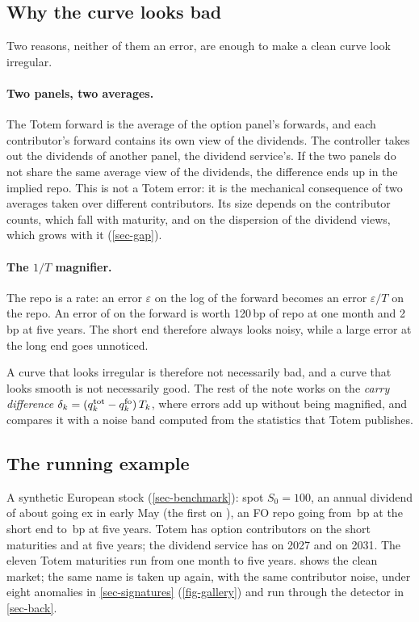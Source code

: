 \subsection{Why the curve looks bad}
Two reasons, neither of them an error, are enough to make a clean curve look irregular.

\paragraph{Two panels, two averages.} The Totem forward is the average of the option panel's forwards, and each
contributor's forward contains its own view of the dividends. The controller takes out the dividends of another panel,
the dividend service's. If the two panels do not share the same average view of the dividends, the difference ends
up in the implied repo. This is not a Totem error: it is the mechanical consequence of two averages taken over
different contributors. Its size depends on the contributor counts, which fall with maturity, and on the dispersion of
the dividend views, which grows with it (\cref{sec-gap}).

\paragraph{The $1/T$ magnifier.} The repo is a rate: an error $\varepsilon$ on the log of the forward becomes an error
$\varepsilon/T$ on the repo. An error of  on the forward is worth \num{120}\,bp of repo at one month and
\num{2}\,bp at five years. The short end therefore always looks noisy, while a large error at the long end goes
unnoticed.

A curve that looks irregular is therefore not necessarily bad, and a curve that looks smooth is not necessarily good.
The rest of the note works on the \emph{carry difference} $\delta_k=(q^{\mathrm{tot}}_k-q^{\mathrm{fo}}_k)\,T_k$, where errors add up
without being magnified, and compares it with a noise band computed from the statistics that Totem publishes.

\subsection{The running example}\label{sec-running}
\begin{filrouge}
A synthetic European stock (\cref{sec-benchmark}): spot $S_0=100$, an annual dividend of about \vRunDiv{} going ex in
early May (the first on \vRunExDate), an FO repo going from \vRunQfoShort\,bp at the short end to \vRunQfoLong\,bp at
five years. Totem has \vRunNoptShort{} option contributors on the short maturities and \vRunNoptLong{} at five years;
the dividend service has \vRunNdivShort{} on 2027 and \vRunNdivLong{} on 2031. The eleven Totem maturities run from
one month to five years.  shows the clean market; the same name is taken up again, with the same
contributor noise, under eight anomalies in \cref{sec-signatures} (\cref{fig-gallery}) and run through the detector in
\cref{sec-back}.
\end{filrouge}

